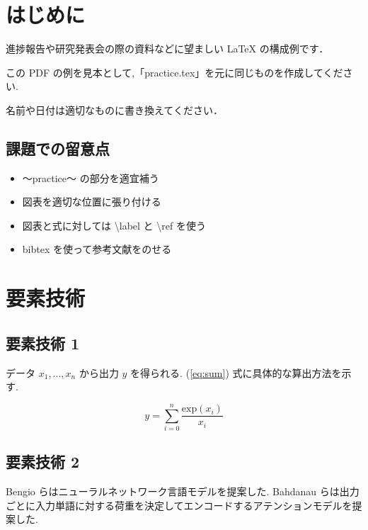 \documentclass[twocolumn]{jarticle}     %
\begin{document}

\section{はじめに}
進捗報告や研究発表会の際の資料などに望ましい LaTeX の構成例です．\par
この PDF の例を見本として,「practice.tex」を元に同じものを作成してください.\par
名前や日付は適切なものに書き換えてください．

\subsection{課題での留意点}

\begin{itemize}
\item 〜practice〜 の部分を適宜補う
\item 図表を適切な位置に張り付ける
\item 図表と式に対しては \textbackslash label と \textbackslash ref を使う
\item bibtex を使って参考文献をのせる
\end{itemize}

\section{要素技術}

\subsection{要素技術 1}
データ $x_{1},...,x_{n}$ から出力 $y$ を得られる.  (\ref{eq:sum}) 式に具体的な算出方法を示す.

\begin{equation}
  y = \sum^{n}_{i=0} \frac{\mathrm{exp}(x_{i})}{x_{i}}
  \label{eq:sum}
\end{equation}

\subsection{要素技術 2}
Bengio らはニューラルネットワーク言語モデルを提案した\cite{FFNN}.
 Bahdanau らは出力ごとに入力単語に対する荷重を決定してエンコードするアテンションモデルを提案した\cite{translate}.
\end{document}
